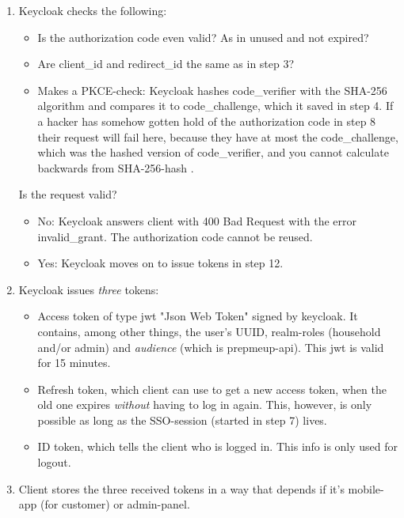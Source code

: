 \documentclass[a4paper,11pt]{article}
\begin{document}
\begin{enumerate}
\begin{itemize}
            \item code\_verifier: The secret string from step 2 (un-hashed).
            \item same client\_id and redirect\_uri as in step 3.
        \end{itemize}
    \item Keycloak checks the following:
        \begin{itemize}
            \item Is the authorization code even valid? As in unused and not expired?
            \item Are client\_id and redirect\_id the same as in step 3?
            \item Makes a PKCE-check: Keycloak hashes code\_verifier with the SHA-256 algorithm and compares it to code\_challenge, which it saved in step 4. If a hacker has somehow gotten hold of the authorization code in step 8 their request will fail here, because they have at most the code\_challenge, which was the hashed version of code\_verifier, and you cannot calculate backwards from SHA-256-hash \cite[sec.~1]{nist-fips-180-4}.
        \end{itemize}
        Is the request valid?
        \begin{itemize}
            \item No: Keycloak answers client with 400 Bad Request with the error invalid\_grant. The authorization code cannot be reused.
            \item Yes: Keycloak moves on to issue tokens in step 12.
        \end{itemize}
    \item Keycloak issues \textit{three} tokens:
        \begin{itemize}
            \item Access token of type jwt "Json Web Token" signed by keycloak. It contains, among other things, the user's UUID, realm-roles (household and/or admin) and \textit{audience} (which is prepmeup-api). This jwt is valid for 15 minutes.
            \item Refresh token, which client can use to get a new access token, when the old one expires \textit{without} having to log in again. This, however, is only possible as long as the SSO-session (started in step 7) lives.
            \item ID token, which tells the client who is logged in. This info is only  used for logout.
        \end{itemize}
    \item Client stores the three received tokens in a way that depends if it's mobile-app (for customer) or admin-panel.

\end{enumerate}
\end{document}
